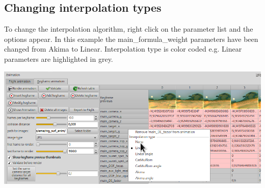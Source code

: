\subsection{Changing interpolation types}\label{changing-interpolation-types}

To change the interpolation algorithm, right click on the parameter list and the
options appear. In this example the main\_formula\_weight parameters have been
changed from Akima to Linear. Interpolation type is color coded e.g. Linear
parameters are highlighted in grey.

\includegraphics[width=\linewidth]{img/manual/media/change_interpolation_type.png}
